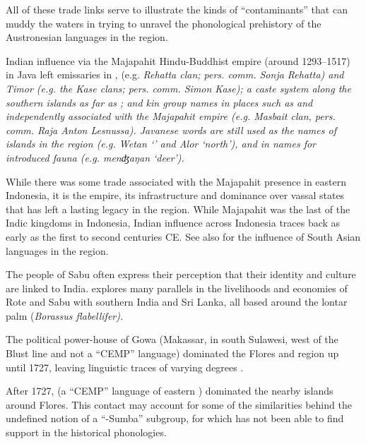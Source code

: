 All of these trade links serve to illustrate the kinds of “contaminants”
that can muddy the waters in trying to unravel the phonological
prehistory of the Austronesian languages in the region.

Indian influence via the Majapahit Hindu-Buddhist empire (around
1293--1517) in  Java left emissaries in , 
(e.g. \it{Rehatta} clan; pers. comm.
Sonja Rehatta) and Timor (e.g.
the \it{Kase} clans; pers. comm.
Simon Kase); a caste system along the southern islands as far
 as ; and kin group names in places such as 
and  independently associated with the Majapahit empire
(e.g. \it{Masbait} clan, pers. comm.
Raja Anton Lesnussa). Javanese words are still used as the names
of islands in the region (e.g.
\it{Wetan} ‘’ and \it{Alor} ‘north’), and in names for introduced
fauna (e.g.  \it{menʤaŋan} ‘deer’).

While there was some trade associated with the Majapahit presence
in eastern Indonesia, it is the empire,
its infrastructure and dominance over vassal states that has
left a lasting legacy in the region.
While Majapahit was the last of the Indic
kingdoms in Indonesia, Indian influence across
Indonesia traces back as early as the
first to second centuries CE.
See also \citet{Hoogervorst2016,Hoogervorst2017,Hoogervorst2023,Hoogervorst2024}
for the influence of South Asian languages in the region.

The people of Sabu often express their perception that their
identity and culture are linked to India.
\citet[199--244]{Fox1977} explores many parallels in the livelihoods
and economies of Rote
and Sabu with southern India
and Sri Lanka, all based around the lontar palm (\it{Borassus flabellifer}).

The political power-house of Gowa (Makassar,
in south Sulawesi, west of the Blust line
and not a “CEMP” language) dominated the Flores
and  region up until 1727,
leaving linguistic traces of varying degrees \citep[585]{VerheijenGrimes1995}.

After 1727,  (a “CEMP” language of eastern ) dominated
the nearby islands around Flores.
This contact may account for some of the similarities behind
the undefined notion of a “-Sumba” subgroup,
for which \citet{Blust2008} has not been able to find support
in the historical phonologies.

